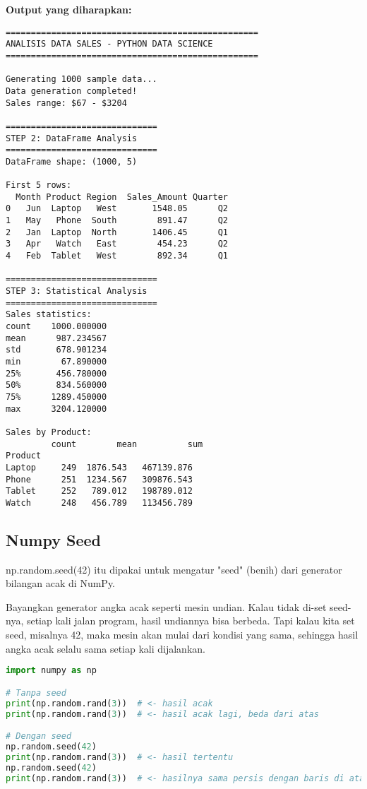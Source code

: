 \textbf{Output yang diharapkan:}
\begin{lstlisting}[style=bash]
==================================================
ANALISIS DATA SALES - PYTHON DATA SCIENCE
==================================================

Generating 1000 sample data...
Data generation completed!
Sales range: $67 - $3204

==============================
STEP 2: DataFrame Analysis
==============================
DataFrame shape: (1000, 5)

First 5 rows:
  Month Product Region  Sales_Amount Quarter
0   Jun  Laptop   West       1548.05      Q2
1   May   Phone  South        891.47      Q2
2   Jan  Laptop  North       1406.45      Q1
3   Apr   Watch   East        454.23      Q2
4   Feb  Tablet   West        892.34      Q1

==============================
STEP 3: Statistical Analysis
==============================
Sales statistics:
count    1000.000000
mean      987.234567
std       678.901234
min        67.890000
25%       456.780000
50%       834.560000
75%      1289.450000
max      3204.120000

Sales by Product:
         count        mean          sum
Product
Laptop     249  1876.543   467139.876
Phone      251  1234.567   309876.543
Tablet     252   789.012   198789.012
Watch      248   456.789   113456.789
\end{lstlisting}

\subsection*{Numpy Seed}
\noindent np.random.seed(42) itu dipakai untuk mengatur "seed" (benih) dari generator bilangan acak di NumPy.

\noindent Bayangkan generator angka acak seperti mesin undian. Kalau tidak di-set seed-nya, setiap kali jalan program, hasil undiannya bisa berbeda. Tapi kalau kita set seed, misalnya 42, maka mesin akan mulai dari kondisi yang sama, sehingga hasil angka acak selalu sama setiap kali dijalankan.

\begin{lstlisting}[language=python, style=python]
import numpy as np

# Tanpa seed
print(np.random.rand(3))  # <- hasil acak
print(np.random.rand(3))  # <- hasil acak lagi, beda dari atas

# Dengan seed
np.random.seed(42)
print(np.random.rand(3))  # <- hasil tertentu
np.random.seed(42)
print(np.random.rand(3))  # <- hasilnya sama persis dengan baris di atas
\end{lstlisting}

